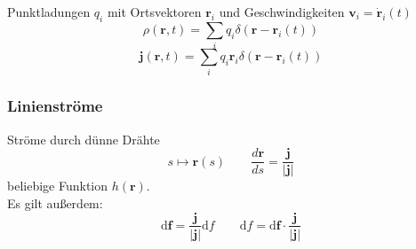\documentclass[titlepage,11pt,a4paper,ngerman]{report}
\newcommand{\tx}[1]{\textrm{#1}}
\newcommand{\dd}{\tx{d}}
\renewcommand{\vec}[1]{\boldsymbol{#1}}
\begin{document}
Punktladungen $ q_i $ mit Ortsvektoren $ \vec{r}_i $ und Geschwindigkeiten $ \vec{v}_i = \dot{\vec{r}}_i(t) $
\begin{equation*}
\rho(\vec{r},t) = \sum_i q_i \delta(\vec{r} - \vec{r}_i(t)) 
\end{equation*}
\begin{equation*}
\vec{j}(\vec{r},t) = \sum_i q_i \vec{r}_i \delta(\vec{r} - \vec{r}_i(t))
\end{equation*}
\begin{minipage}{.6\linewidth}
	\subsubsection{Linienströme}
	
	Ströme durch dünne Drähte
	$$ s \mapsto \vec{r}(s) \qquad \frac{d\vec{r}}{ds} = \frac{\vec{j}}{|\vec{j}|} $$
	beliebige Funktion $ h(\vec{r}) $.\\
	Es gilt außerdem:
	\begin{equation*}
	\dd \vec{f} = \frac{\vec{j}}{|\vec{j}|} \dd f \qquad \dd f = \dd \vec{f} \cdot \frac{\vec{j}}{|\vec{j}|}
	\end{equation*}
\end{minipage}%
\end{document}
